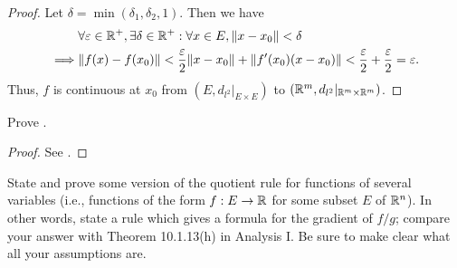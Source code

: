 \begin{proof}
  Let \(\delta = \min(\delta_1, \delta_2, 1)\).
  Then we have
  \begin{align*}
             & \forall \varepsilon \in \R^+, \exists \delta \in \R^+ : \forall x \in E, \norm*{x - x_0} < \delta                                                          \\
    \implies & \norm*{f(x) - f(x_0)} < \dfrac{\varepsilon}{2} \norm*{x - x_0} + \norm*{f'(x_0)(x - x_0)} < \dfrac{\varepsilon}{2} + \dfrac{\varepsilon}{2} = \varepsilon.
  \end{align*}
  Thus, \(f\) is continuous at \(x_0\) from \((E, d_{l^2}|_{E \times E})\) to \((\mathbb{R}^m, d_{l^2}|_{\mathbb{R}^m \times \mathbb{R}^m})\).
\end{proof}

\begin{ex}\label{ii:ex:6.4.3}
  Prove .
\end{ex}

\begin{proof}
  See .
\end{proof}

\begin{ex}\label{ii:ex:6.4.4}
  State and prove some version of the quotient rule for functions of several variables (i.e., functions of the form \(f : E \to \mathbb{R}\) for some subset \(E\) of \(\mathbb{R}^n\)).
  In other words, state a rule which gives a formula for the gradient of \(f / g\);
  compare your answer with Theorem 10.1.13(h) in Analysis I.
  Be sure to make clear what all your assumptions are.
\end{ex}

